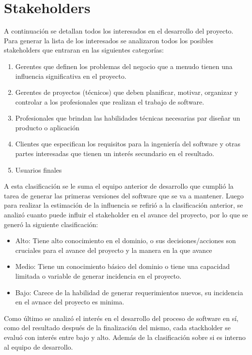 \section{Stakeholders}

A continuación se detallan todos los interesados en el desarrollo del proyecto. Para generar la lista de los interesados se analizaron todos los posibles stakeholders que entraran en las siguientes categorías:
\begin{enumerate}
    \item Gerentes que definen los problemas del negocio que a menudo tienen una influencia significativa en el proyecto.
    \item Gerentes de proyectos (técnicos) que deben planificar, motivar, organizar y controlar a los profesionales que realizan el trabajo de software.
    \item Profesionales que brindan las habilidades técnicas necesarias par diseñar un producto o aplicación
    \item Clientes que especifican los requisitos para la ingeniería del software y otras partes interesadas que tienen un interés secundario en el resultado.
    \item Usuarios finales
\end{enumerate}
A esta clasificación se le suma el equipo anterior de desarrollo que cumplió la tarea de generar las primeras versiones del software que se va a mantener.
Luego para realizar la estimación de la influencia se refirió a la clasificación anterior, se analizó cuanto puede influir el stakeholder en el avance del proyecto, por lo que se generó la siguiente clasificación:

\begin{itemize}
    \item Alto: Tiene alto conocimiento en el dominio, o sus decisiones/acciones son cruciales para el avance del proyecto y la manera en la que avance
    \item Medio: Tiene un conocimiento básico del dominio o tiene una capacidad limitada o variable de generar incidencia en el proyecto.
    \item Bajo: Carece de la habilidad de generar requerimientos nuevos, su incidencia en el avnace del proyecto es minima.
\end{itemize}

Como último se analizó el interés en el desarrollo del proceso de software en sí, como del resultado después de la finalización del mismo, cada stackholder se evaluó con interés entre bajo y alto. Además de la clasificación sobre si es interno al equipo de desarrollo.

